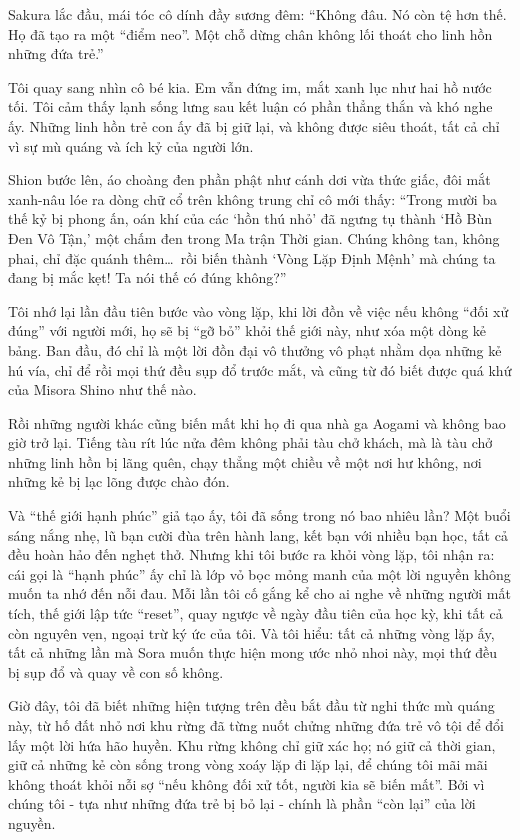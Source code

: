 \documentclass[../main.tex]{subfiles}
\begin{document}
Sakura lắc đầu, mái tóc cô dính đầy sương đêm: ``Không đâu. Nó còn tệ hơn thế. Họ đã tạo ra một ``điểm neo''. Một chỗ dừng chân không lối thoát cho linh hồn những đứa trẻ.''

Tôi quay sang nhìn cô bé kia. Em vẫn đứng im, mắt xanh lục như hai hồ nước tối. Tôi cảm thấy lạnh sống lưng sau kết luận có phần thẳng thắn và khó nghe ấy. Những linh hồn trẻ con ấy đã bị giữ lại, và không được siêu thoát, tất cả chỉ vì sự mù quáng và ích kỷ của người lớn.

Shion bước lên, áo choàng đen phần phật như cánh dơi vừa thức giấc, đôi mắt xanh-nâu lóe ra dòng chữ cổ trên không trung chỉ cô mới thấy: ``Trong mười ba thế kỷ bị phong ấn, oán khí của các `hồn thú nhỏ' đã ngưng tụ thành `Hồ Bùn Đen Vô Tận,' một chấm đen trong Ma trận Thời gian. Chúng không tan, không phai, chỉ đặc quánh thêm\dots\ rồi biến thành `Vòng Lặp Định Mệnh' mà chúng ta đang bị mắc kẹt! Ta nói thế có đúng không?''

Tôi nhớ lại lần đầu tiên bước vào vòng lặp, khi lời đồn về việc nếu không ``đối xử đúng'' với người mới, họ sẽ bị ``gỡ bỏ'' khỏi thế giới này, như xóa một dòng kẻ bảng. Ban đầu, đó chỉ là một lời đồn đại vô thưởng vô phạt nhằm dọa những kẻ hú vía, chỉ để rồi mọi thứ đều sụp đổ trước mắt, và cũng từ đó biết được quá khứ của Misora Shino như thế nào.

Rồi những người khác cũng biến mất khi họ đi qua nhà ga Aogami và không bao giờ trở lại. Tiếng tàu rít lúc nửa đêm không phải tàu chở khách, mà là tàu chở những linh hồn bị lãng quên, chạy thẳng một chiều về một nơi hư không, nơi những kẻ bị lạc lõng được chào đón.

Và ``thế giới hạnh phúc'' giả tạo ấy, tôi đã sống trong nó bao nhiêu lần? Một buổi sáng nắng nhẹ, lũ bạn cười đùa trên hành lang, kết bạn với nhiều bạn học, tất cả đều hoàn hảo đến nghẹt thở. Nhưng khi tôi bước ra khỏi vòng lặp, tôi nhận ra: cái gọi là ``hạnh phúc'' ấy chỉ là lớp vỏ bọc mỏng manh của một lời nguyền không muốn ta nhớ đến nỗi đau. Mỗi lần tôi cố gắng kể cho ai nghe về những người mất tích, thế giới lập tức ``reset'', quay ngược về ngày đầu tiên của học kỳ, khi tất cả còn nguyên vẹn, ngoại trừ ký ức của tôi. Và tôi hiểu: tất cả những vòng lặp ấy, tất cả những lần mà Sora muốn thực hiện mong ước nhỏ nhoi này, mọi thứ đều bị sụp đổ và quay về con số không.

Giờ đây, tôi đã biết những hiện tượng trên đều bắt đầu từ nghi thức mù quáng này, từ hố đất nhỏ nơi khu rừng đã từng nuốt chửng những đứa trẻ vô tội để đổi lấy một lời hứa hão huyền. Khu rừng không chỉ giữ xác họ; nó giữ cả thời gian, giữ cả những kẻ còn sống trong vòng xoáy lặp đi lặp lại, để chúng tôi mãi mãi không thoát khỏi nỗi sợ ``nếu không đối xử tốt, người kia sẽ biến mất''. Bởi vì chúng tôi - tựa như những đứa trẻ bị bỏ lại - chính là phần ``còn lại'' của lời nguyền.
\end{document}
